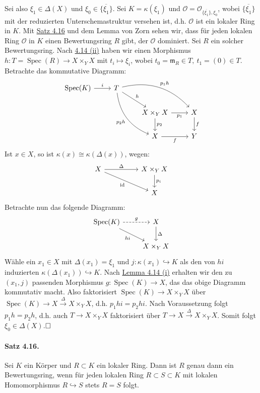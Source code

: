 \documentclass[11pt,b5paper,openany]{memoir}
\def \qed {$\hfill\square$}
\begin{document}
\begin{itemize}
Sei also $\xi_1\in\Delta(X)$ und $\xi_0\in\overline{\{\xi_1\}}$. Sei $K=\kappa(\xi_1)$ und $\mathcal{O}=\mathcal{O}_{\overline{\{\xi_1\}},\xi_0}$, wobei $\overline{\{\xi_1\}}$ mit der reduzierten Unterschemastruktur versehen ist, d.h. $\mathcal{O}$ ist ein lokaler Ring in $K$. Mit \hyperref[4.16]{Satz 4.16} und dem Lemma von Zorn sehen wir, dass für jeden lokalen Ring $\mathcal{O}$ in $K$ einen Bewertungsring $R$ gibt, der $\mathcal{O}$ dominiert. Sei $R$ ein solcher Bewertungsring. Nach \hyperref[4.14]{4.14 (ii)} haben wir einen Morphismus $h:T=\operatorname{Spec}(R)\to X\times_YX$ mit $t_i\mapsto\xi_i$, wobei $t_0=\mathfrak{m}_R\in T,\ t_1=(0)\in T$. Betrachte das kommutative Diagramm:
\[\begin{tikzcd}
\operatorname{Spec}(K)\ar[r, "i"] & T\ar[dr, "h"]\ar[rrd, "p_1h", bend left]\ar[ddr, "p_2h"', bend right]\\
& & X\times_YX\ar[r, "p_1"']\ar[d, "p_2"] & X\ar[d, "f"]\\
&& X\ar[r, "f"'] & Y
\end{tikzcd}\]
Ist $x\in X$, so ist $\kappa(x)\cong\kappa(\Delta(x))$, wegen:
\[\begin{tikzcd}
X\ar[rr, "\Delta"]\ar[rrd, "\operatorname{id}"'] & & X\times_Y X\ar[d, "p_i"]\\
&& X
\end{tikzcd} \]
Betrachte nun das folgende Diagramm:
\[\begin{tikzcd}
\operatorname{Spec}(K)\ar[rd, "hi"']\ar[r, "g", dashed] & X\ar[d, "\Delta"] \\
& X\times_YX 
\end{tikzcd}\]
Wähle ein $x_1\in X$ mit $\Delta(x_1)=\xi_1$ und $j:\kappa(x_1)\hookrightarrow K$ als den von $hi$ induzierten $\kappa(\Delta(x_1))\hookrightarrow K$. Nach \hyperref[4.14]{Lemma 4.14 (i)} erhalten wir den zu $(x_1, j)$ passenden Morphismus $g:\operatorname{Spec}(K)\to X$, das das obige Diagramm kommutativ macht. Also faktorisiert $\operatorname{Spec}(K)\to X\times_YX$ über $\operatorname{Spec}(K)\to X\stackrel{\Delta}{\to}X\times_YX$, d.h. $p_1hi=p_2hi$. Nach Voraussetzung folgt $p_1h=p_2h$, d.h. auch $T\to X\times_YX$ faktorisiert über $T\to X\stackrel{\Delta}{\to}X\times_YX$. Somit folgt $\xi_0\in \Delta(X)$.\qed
\end{itemize}

\paragraph{Satz 4.16.}\label{4.16} Sei $K$ ein Körper und $R\subset K$ ein lokaler Ring. Dann ist $R$ genau dann ein Bewertungsring, wenn für jeden lokalen Ring $R\subset S\subset K$ mit lokalen Homomorphismus $R\hookrightarrow S$ stets $R=S$ folgt.
\end{document}
